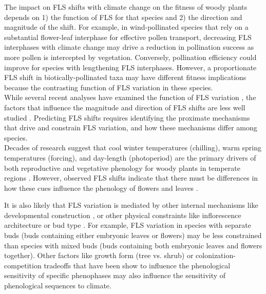 \documentclass[12pt]{article}\usepackage[]{graphicx}\usepackage[]{color}
\begin{document}
\noindent The impact on FLS shifts with climate change on the fitness of woody plants depends on 1) the function of FLS for that species and 2) the direction and magnitude of the shift. For example, in wind-pollinated species that rely on a substantial flower-leaf interphase for effective pollen transport, decreasing FLS interphases with climate change may drive a reduction in pollination success as more pollen is intercepted by vegetation. Conversely, pollination efficiency could improve for species with lengthening FLS interphases. However, a proportionate FLS shift in biotically-pollinated taxa may have different fitness implications because the contrasting function of FLS variation in these species.\\


\noindent While several recent analyses have examined the function of FLS variation \citep[e.g.][]{Buonaiuto2020, Gougherty2018}, the factors that influence the magnitude and direction of FLS shifts are less well studied  \citep[but see][]{Ma2020:aa}. Predicting FLS shifts requires identifying the proximate mechanisms that drive and constrain FLS variation, and how these mechanisms differ among species.\\
 
\noindent Decades of research suggest that cool winter temperatures (chilling), warm spring temperatures (forcing), and day-length (photoperiod) are the primary drivers of both reproductive and vegetative phenology  for woody plants in temperate regions \citep{Korner:2010aa,Flynn2018}. However, observed FLS shifts indicate that there must be differences in how these cues influence the phenology of flowers and leaves \citep{Buonaiuto2020}.

\noindent It is also likely that FLS variation is mediated by other internal mechanisms like developmental construction \citep{Diggle1995}, or other physical constraints like inflorescence architecture or bud type \citep{Pope2013}. For example, FLS variation in species with separate buds (buds containing either embryonic leaves or flowers) may be less constrained than species with mixed buds (buds containing both embryonic leaves and flowers together). Other factors like growth form (tree vs. shrub) or colonization-competition tradeoffs that have been show to influence the phenological sensitivity of specific phenophases \citep{Basler:2012aa,Donnelly:2021aa} may also influence the sensitivity of phenological sequences to climate.\\
\end{document}
